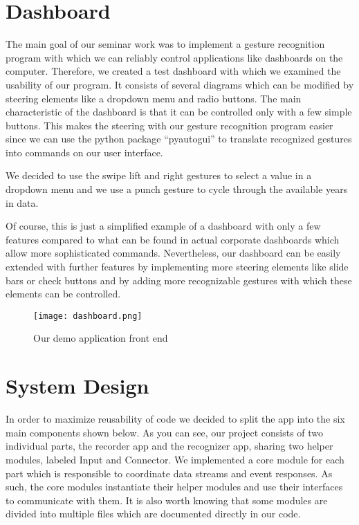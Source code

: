 \chapter{Dashboard}
\label{ch:Dashboard}

The main goal of our seminar work was to implement a gesture recognition program with which we can reliably control applications like dashboards on the computer.
Therefore, we created a test dashboard with which we examined the usability of our program.
It consists of several diagrams which can be modified by steering elements like a dropdown menu and radio buttons.
The main characteristic of the dashboard is that it can be controlled only with a few simple buttons.
This makes the steering with our gesture recognition program easier since we can use the python package “pyautogui” to translate recognized gestures into commands on our user interface.

We decided to use the swipe lift and right gestures to select a value in a dropdown menu and we use a punch gesture to cycle through the available years in data.

Of course, this is just a simplified example of a dashboard with only a few features compared to what can be found in actual corporate dashboards which allow more sophisticated commands.
Nevertheless, our dashboard can be easily extended with further features by implementing more steering elements like slide bars or check buttons and by adding more recognizable gestures with which these elements can be controlled.  

\begin{figure}[htp]
\begin{center}
  \texttt{[image: dashboard.png]}
\caption{Our demo application front end}
\end{center}
\end{figure} 


\chapter{System Design}
\label{ch:SystemDesign}

In order to maximize reusability of code we decided to split the app into the six main components shown below. As you can see, our project consists of two individual parts, the recorder app and the recognizer app, sharing two helper modules, labeled Input and Connector. We implemented a core module for each part which is responsible to coordinate data streams and event responses. As such, the core modules instantiate their helper modules and use their interfaces to communicate with them. It is also worth knowing that some modules are divided into multiple files which are documented directly in our code.

